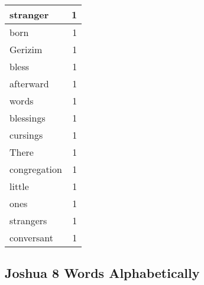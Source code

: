 \begin{center}
\begin{longtable}{l|r}
stranger & 1\\ \hline 
born & 1\\ \hline 
Gerizim & 1\\ \hline 
bless & 1\\ \hline 
afterward & 1\\ \hline 
words & 1\\ \hline 
blessings & 1\\ \hline 
cursings & 1\\ \hline 
There & 1\\ \hline 
congregation & 1\\ \hline 
little & 1\\ \hline 
ones & 1\\ \hline 
strangers & 1\\ \hline 
conversant & 1\\ \hline 
\end{longtable}
\end{center}





\subsection{Joshua 8 Words Alphabetically}


\normalsize
 
